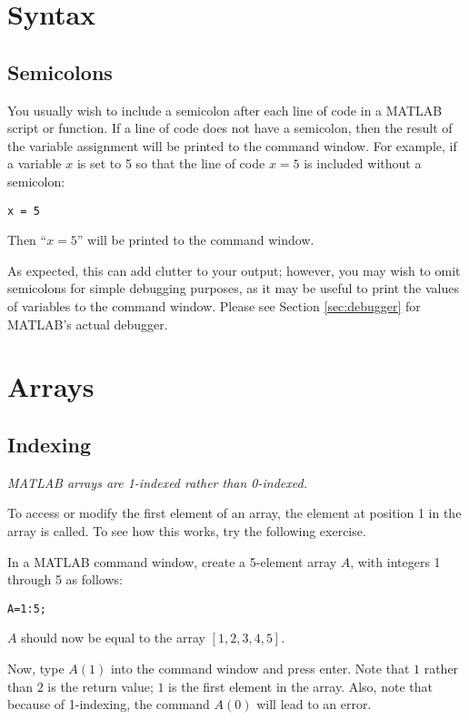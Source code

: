 \documentclass{article}
\begin{document}
\section{Syntax}
\subsection{Semicolons}
You usually wish to include a semicolon after each line of code in a MATLAB script or function. If a line of code does not have a semicolon, then the result of the variable assignment will be printed to the command window. For example, if a variable $x$ is set to 5 so that the line of code $x=5$ is included without a semicolon:
\begin{lstlisting}[style=Matlab-editor]
x = 5
\end{lstlisting}
Then ``$x=5$'' will be printed to the command window.

As expected, this can add clutter to your output; however, you may wish to omit semicolons for simple debugging purposes, as it may be useful to print the values of variables to the command window. Please see Section \ref{sec:debugger} for MATLAB's actual debugger.


\section{Arrays}

\subsection{Indexing}

\emph{MATLAB arrays are 1-indexed rather than 0-indexed.} 

To access or modify the first element of an array, the element at position 1 in the array is called. To see how this works, try the following exercise.

In a MATLAB command window, create a 5-element array $A$, with integers 1 through 5 as follows: \begin{lstlisting}[style=Matlab-editor]
A=1:5;
\end{lstlisting}

$A$ should now be equal to the array $[1,2,3,4,5]$.

Now, type $A(1)$ into the command window and press enter. Note that $1$ rather than $2$ is the return value; $1$ is the first element in the array. Also, note that because of 1-indexing, the command $A(0)$ will lead to an error.
\end{document}
